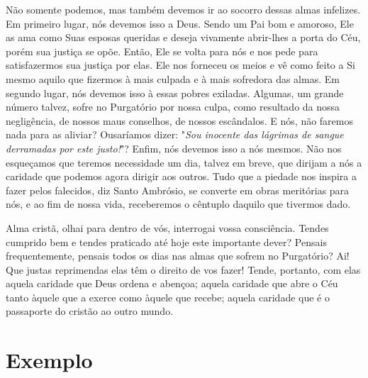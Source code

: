 Não somente podemos, mas também devemos ir ao socorro dessas almas infelizes. Em primeiro lugar, nós devemos isso a Deus. Sendo um Pai bom e amoroso, Ele as ama como Suas esposas queridas e deseja vivamente abrir-lhes a porta do Céu, porém sua justiça se opõe. Então, Ele se volta para nós e nos pede para satisfazermos sua justiça por elas. Ele nos forneceu os meios e vê como feito a Si mesmo aquilo que fizermos à mais culpada e à mais sofredora das almas. Em segundo lugar, nós devemos isso à essas pobres exiladas. Algumas, um grande número talvez, sofre no Purgatório por nossa culpa, como resultado da nossa negligência, de nossos maus conselhos, de nossos escândalos. E nós, não faremos nada para as aliviar? Ousaríamos dizer: "\textit{Sou inocente das lágrimas de sangue derramadas por este justo!}"? Enfim, nós devemos isso a nós mesmos. Não nos esqueçamos que teremos necessidade um dia, talvez em breve, que dirijam a nós a caridade que podemos agora dirigir aos outros. Tudo que a piedade nos inspira a fazer pelos falecidos, diz Santo Ambrósio, se converte em obras meritórias para nós, e ao fim de nossa vida, receberemos o cêntuplo daquilo que tivermos dado. 

Alma cristã, olhai para dentro de vós, interrogai vossa consciência. Tendes cumprido bem e tendes praticado até hoje este importante dever? Pensais frequentemente, pensais todos os dias nas almas que sofrem no Purgatório? Ai! Que justas reprimendas elas têm o direito de vos fazer! Tende, portanto, com elas aquela caridade que Deus ordena e abençoa; aquela caridade que abre o Céu tanto àquele que a exerce como àquele que recebe; aquela caridade que é o passaporte do cristão ao outro mundo.


\section*{Exemplo}

